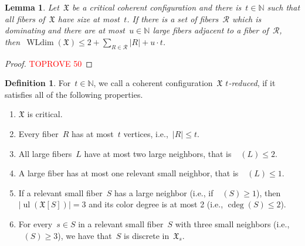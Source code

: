 \documentclass[english,a4paper]{article}
\theoremstyle{plain}
\newtheorem{lemma}      [theorem]{Lemma}
\theoremstyle{definition}
\newtheorem{definition} [theorem]{Definition}
\newcommand{\Nat}{\ensuremath{\mathbb{N}}}
\newcommand{\coherentConfig}{\ensuremath{\mathfrak{X}}}
\newcommand{\inducedCC}[1]{\ensuremath{\coherentConfig[#1]}}
\DeclareMathOperator*{\ul}{ul}
\DeclareMathOperator*{\WLdim}{WLdim}
\newcommand{\wldim}[1]{\ensuremath{\WLdim\left(#1\right)}}
\DeclareMathOperator{\ColorDeg}{cdeg}
\DeclareMathOperator{\ColorDegLarge}{cdeg_L}
\DeclareMathOperator{\ColorDegSmall}{cdeg_S}
\DeclareMathOperator{\ColorDegRelevantSmall}{cdeg_{rS}}
\newcommand{\colorDeg}[1]{\ensuremath{\ColorDeg\left(#1\right)}}
\newcommand{\colorDegLarge}[1]{\ensuremath{\ColorDegLarge\left(#1\right)}}
\newcommand{\colorDegSmall}[1]{\ensuremath{\ColorDegSmall\left(#1\right)}}
\newcommand{\colorDegRelevantSmall}[1]{\ensuremath{\ColorDegRelevantSmall\left(#1\right)}}
\begin{document}
\begin{lemma}
\label{dominating:wldim/lem}
    Let~$\coherentConfig$ be a critical coherent configuration and there is~$t \in \Nat$ such that all fibers of~$\coherentConfig$ have size at most~$t$.
    If there is a set of fibers~$\mathcal{R}$ which is dominating and there are at most~$u \in \Nat$ large fibers adjacent to a fiber of~$\mathcal{R}$, then~$\wldim{\coherentConfig} \leq 2 + \sum_{R \in \mathcal{R}} |R| + u \cdot t$.
\end{lemma}
\begin{proof}\textcolor{red}{TOPROVE 50}\end{proof}


\begin{definition}
\label{new:global-argument:assumption}
    For~$t\in \Nat$, we call a coherent configuration~$\coherentConfig$ \emph{$t$-reduced}, if it satisfies all of the following properties.
    \begin{enumerate}
        \item \label{new:global-argument:assumption:critical}
        $\coherentConfig$ is critical.
        \item \label{new:global-argument:assumption:limited-fiber-size}
        Every fiber~$R$ has at most~$t$ vertices, i.e.,~$|R|\leq t$.
        \item \label{new:global-argument:assumption:large-colorDeg}
        All large fibers~$L$ have at most two large neighbors, that is~$\colorDegLarge{L} \leq 2$.
        \item \label{new:global-argument:assumption:large-one-relevent}
        A large fiber has at most one relevant small neighbor, that is~$\colorDegRelevantSmall{L} \leq 1$.
        \item \label{new:global-argument:assumption:relevant-2-neighbors}
        If a relevant small fiber~$S$ has a large neighbor (i.e., if~$\colorDegLarge{S}\geq 1$), then~$|\ul(\inducedCC{S})| = 3$ and its color degree is at most 2 (i.e., $\colorDeg{S}\leq 2$).
        \item \label{new:global-argument:assumption:relevant-3-neighbors}
        For every~$s\in S$ in a relevant small fiber~$S$ with three small neighbors (i.e.,~$\colorDegSmall{S}\geq 3$), we have that~$S$ is discrete in~$\coherentConfig_s$.
    \end{enumerate}
\end{definition}
\end{document}
